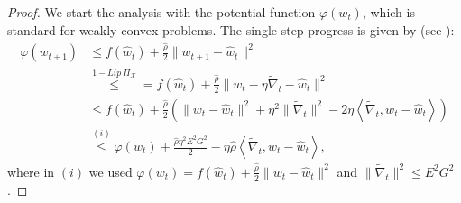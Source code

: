 \documentclass{article} %
\begin{document}
\begin{proof}
    We start the analysis with the potential function $\varphi(w_t)$, which is standard for weakly convex problems. The single-step progress is given by (see \citet{huang2023oracle}):
    \begin{align*}
        \varphi(w_{t+1}) &\le f(\hat{w}_t) + \frac{\hat{\rho}}{2} \|w_{t+1} - \hat{w}_t\|^2 \\
        &\overset{1-Lip\ \Pi_{\mathcal{X}}}{\leq}= f(\hat{w}_t) + \frac{\hat{\rho}}{2} \| w_t - \eta \tilde{\nabla}_t - \hat{w}_t \|^2 \\
        &\le f(\hat{w}_t) + \frac{\hat{\rho}}{2} \left( \|w_t - \hat{w}_t\|^2 + \eta^2 \|\tilde{\nabla}_t\|^2 - 2\eta \left\langle \tilde{\nabla}_t, w_t - \hat{w}_t \right\rangle \right) \\
        &\overset{(i)}{\le} \varphi(w_t) + \frac{\hat{\rho}\eta^2 E^2 G^2}{2} - \eta \hat{\rho} \left\langle \tilde{\nabla}_t, w_t - \hat{w}_t \right\rangle,
    \end{align*}
    where in $(i)$ we used $\varphi(w_t) = f(\hat{w}_t) + \frac{\hat{\rho}}{2}\|w_t - \hat{w}_t\|^2$ and $\|\tilde{\nabla}_t\|^2 \le E^2 G^2$.


\end{proof}
\end{document}
